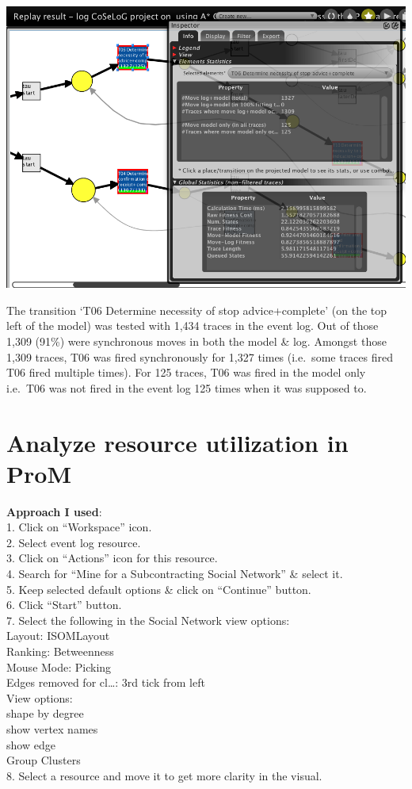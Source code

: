 \documentclass[]{article}
\begin{document}
\includegraphics{CoSeLoG_Step_06_PetriNet_Normative_Conformance_T06.png}

The transition `T06 Determine necessity of stop advice+complete' (on the
top left of the model) was tested with 1,434 traces in the event log.
Out of those 1,309 (91\%) were synchronous moves in both the model \&
log. Amongst those 1,309 traces, T06 was fired synchronously for 1,327
times (i.e.~some traces fired T06 fired multiple times). For 125 traces,
T06 was fired in the model only i.e.~T06 was not fired in the event log
125 times when it was supposed to.

\section{Analyze resource utilization in
ProM}\label{analyze-resource-utilization-in-prom}

\textbf{Approach I used}:\\1. Click on ``Workspace'' icon.\\2. Select
event log resource.\\3. Click on ``Actions'' icon for this resource.\\4.
Search for ``Mine for a Subcontracting Social Network'' \& select
it.\\5. Keep selected default options \& click on ``Continue''
button.\\6. Click ``Start'' button.\\7. Select the following in the
Social Network view options:\\ Layout: ISOMLayout\\ Ranking:
Betweenness\\ Mouse Mode: Picking\\ Edges removed for cl\ldots{}: 3rd
tick from left\\ View options:\\ shape by degree\\ show vertex names\\
show edge\\ Group Clusters\\8. Select a resource and move it to get more
clarity in the visual.
\end{document}
